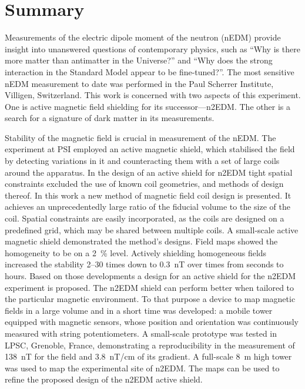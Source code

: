 

\begingroup
\let\clearpage\relax
\let\cleardoublepage\relax
\let\cleardoublepage\relax

\chapter*{Summary} %
Measurements of the electric dipole moment of the neutron (nEDM) provide insight into unanswered questions of contemporary physics, such as ``Why is there more matter than antimatter in the Universe?'' and ``Why does the strong interaction in the Standard Model appear to be fine-tuned?''. The most sensitive nEDM measurement to date was performed in the Paul Scherrer Institute, Villigen, Switzerland. This work is concerned with two aspects of this experiment. One is active magnetic field shielding for its successor---n2EDM\@. The other is a search for a signature of dark matter in its measurements.

Stability of the magnetic field is crucial in measurement of the nEDM\@. The experiment at PSI employed an active magnetic shield, which stabilised the field by detecting  variations in it and counteracting them with a set of large coils around the apparatus.
In the design of an active shield for n2EDM tight spatial constraints excluded the use of known coil geometries, and methods of design thereof.
In this work a new method of magnetic field coil design is presented. It achieves an unprecedentedly large ratio of the fiducial volume to the size of the coil.
Spatial constraints are easily incorporated, as the coils are designed on a predefined grid, which may be shared between multiple coils.
A small-scale active magnetic shield demonstrated the method's designs. Field maps showed the homogeneity to be on a \SI{2}{\percent} level.
Actively shielding homogeneous fields increased the stability 2--30 times down to \SI{0.3}{nT} over times from seconds to hours.
Based on those developments a design for an active shield for the n2EDM experiment is proposed.
The n2EDM shield can perform better when tailored to the particular magnetic environment. To that purpose a device to map magnetic fields in a large volume and in a short time was developed: a mobile tower equipped with magnetic sensors, whose position and orientation was continuously measured with string potentiometers. A small-scale prototype was tested in LPSC, Grenoble, France, demonstrating a reproducibility in the measurement of \SI{138}{nT} for the field and \SI{3.8}{nT/cm} of its gradient. A full-scale \SI{8}{m} high tower was used to map the experimental site of n2EDM\@. The maps can be used to refine the proposed design of the n2EDM active shield.

